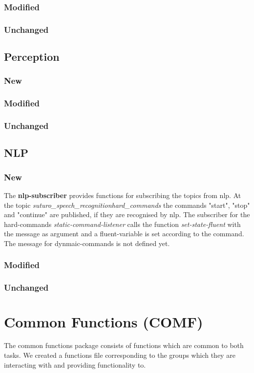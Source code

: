 \documentclass[main.tex]{subfiles}
\begin{document}
                \subsubsection{Modified}
                \subsubsection{Unchanged}
                \subsection{Perception}
                \subsubsection{New}
                \subsubsection{Modified}
                \subsubsection{Unchanged}
                \subsection{NLP}
                \subsubsection{New}
                The \textbf{nlp-subscriber} provides functions for subscribing the topics from nlp. At the topic \textit{suturo\_speech\_recognition\/hard\_commands} the commands "start", "stop" and "continue" are published, if they are recognised by nlp. The subscriber for the hard-commands \textit{static-command-listener} calls the function \textit{set-state-fluent} with the message as argument and a fluent-variable is set according to the command. The message for dynmaic-commands is not defined yet.
                \subsubsection{Modified}
                \subsubsection{Unchanged}

                
                \section{Common Functions (COMF)}
                The common functions package consists of functions which are common to both tasks. We created a functions file corresponding to the groups which they are interacting with and providing functionality to.
\end{document}
